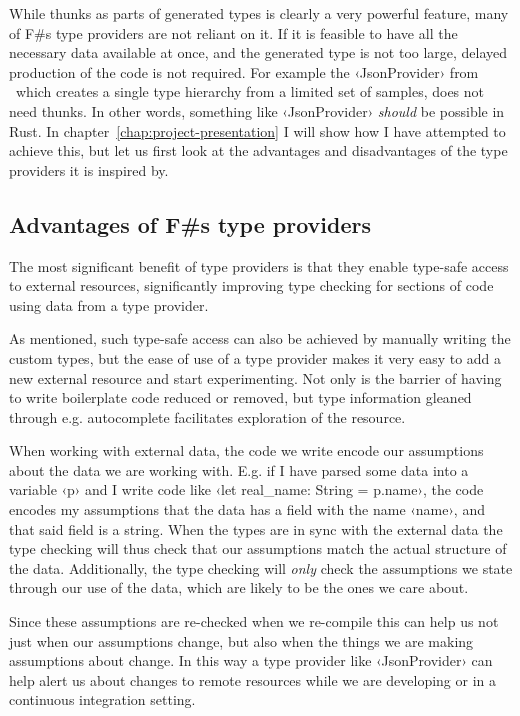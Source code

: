 While thunks as parts of generated types is clearly a very powerful feature, many of F\#s type providers are not reliant on it. If it is feasible to have all the necessary data available at once, and the generated type is not too large, delayed production of the code is not required. For example the ‹JsonProvider› from \fsharpdata\ which creates a single type hierarchy from a limited set of samples, does not need thunks. In other words, something like ‹JsonProvider› \emph{should} be possible in Rust. In chapter~\ref{chap:project-presentation} I will show how I have attempted to achieve this, but let us first look at the advantages and disadvantages of the type providers it is inspired by.

\subsection{Advantages of F\#s type providers}

The most significant benefit of type providers is that they enable type-safe access to external resources, significantly improving type checking for sections of code using data from a type provider.

As mentioned, such type-safe access can also be achieved by manually writing the custom types, but the ease of use of a type provider makes it very easy to add a new external resource and start experimenting. Not only is the barrier of having to write boilerplate code reduced or removed, but type information gleaned through e.g. autocomplete facilitates exploration of the resource.

When working with external data, the code we write encode our assumptions about the data we are working with. E.g. if I have parsed some data into a variable ‹p› and I write code like ‹let real_name: String = p.name›, the code encodes my assumptions that the data has a field with the name ‹name›, and that said field is a string. When the types are in sync with the external data the type checking will thus check that our assumptions match the actual structure of the data. Additionally, the type checking will \emph{only} check the assumptions we state through our use of the data, which are likely to be the ones we care about.

Since these assumptions are re-checked when we re-compile this can help us not just when our assumptions change, but also when the things we are making assumptions about change. In this way a type provider like ‹JsonProvider› can help alert us about changes to remote resources while we are developing or in a continuous  integration setting.

